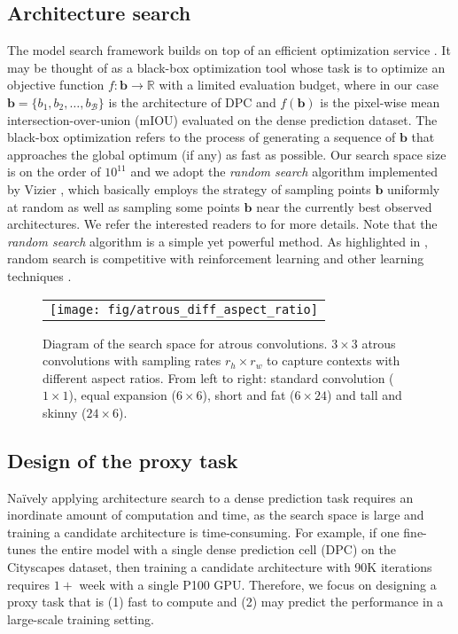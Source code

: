 \documentclass{article}
\begin{document}
\subsection{Architecture search}

The model search framework builds on top of an efficient optimization service \cite{golovin2017google}. It may be thought of as a black-box optimization tool whose task is to optimize an objective function $f: \boldsymbol{b} \rightarrow \mathbb{R}$ with a limited evaluation budget, where in our case $\boldsymbol{b}=\{b_1, b_2, \dots, b_{\mathcal{B}}\}$ is the architecture of DPC and $f(\boldsymbol{b})$ is the pixel-wise mean intersection-over-union (mIOU) \cite{everingham2014pascal} evaluated on the dense prediction dataset. The black-box optimization refers to the process of generating a sequence of $\boldsymbol{b}$ that approaches the global optimum (if any) as fast as possible. Our search space size is on the order of $10^{11}$ and we adopt the \textit{random search} algorithm implemented by Vizier \cite{golovin2017google}, which basically employs the strategy of sampling points $\boldsymbol{b}$ uniformly at random as well as sampling some points $\boldsymbol{b}$ near the currently best observed architectures. We refer the interested readers to \cite{golovin2017google} for more details. Note that the \textit{random search} algorithm is a simple yet powerful method. As highlighted in \cite{zoph2017learning}, random search is competitive with reinforcement learning and other learning techniques \cite{liu2018progressive}.

\begin{figure}[!t]
  \centering
  \begin{tabular}{c}
    \texttt{[image: fig/atrous\_diff\_aspect\_ratio]} \\
  \end{tabular}
  \caption{Diagram of the search space for atrous convolutions. $3\times3$ atrous convolutions with sampling rates $r_h \times r_w$ to capture contexts with different aspect ratios. From left to right: standard convolution ($1\times1$), equal expansion ($6\times6$), short and fat ($6 \times 24$) and tall and skinny ($24\times 6$).}
  \label{fig:atrous_diff_aspect_ratio}
\end{figure}

\subsection{Design of the proxy task}
Na\"{i}vely applying architecture search to a dense prediction task requires an inordinate amount of computation and time, as the search space is large and training a candidate architecture is time-consuming. For example, if one fine-tunes the entire model with a single dense prediction cell (DPC) on the Cityscapes dataset, then training a candidate architecture with 90K iterations requires $1+$ week with a single P100 GPU. Therefore, we focus on designing a proxy task that is (1) fast to compute and (2) may predict the performance in a large-scale training setting.
\end{document}
